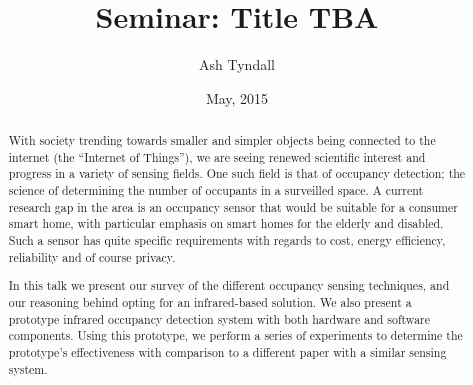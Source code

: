 \documentclass[12pt,a4paper]{article}
\title{Seminar: Title TBA}
\author{Ash Tyndall}
\date{May, 2015}
\begin{document}
\maketitle

\begin{abstract}
With society trending towards smaller and simpler objects being connected to the internet (the ``Internet of Things''), we are seeing renewed scientific interest and progress in a variety of sensing fields. One such field is that of occupancy detection; the science of determining the number of occupants in a surveilled space. A current research gap in the area is an occupancy sensor that would be suitable for a consumer smart home, with particular emphasis on smart homes for the elderly and disabled. Such a sensor has quite specific requirements with regards to cost, energy efficiency, reliability and of course privacy.

In this talk we present our survey of the different occupancy sensing techniques, and our reasoning behind opting for an infrared-based solution. We also present a prototype infrared occupancy detection system with both hardware and software components. Using this prototype, we perform a series of experiments to determine the prototype's effectiveness with comparison to a different paper with a similar sensing system.
\end{abstract}
\end{document}
